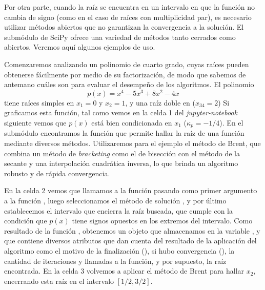 Por otra parte, cuando la raíz se encuentra en un intervalo en que la función no cambia de signo (como en el caso de raíces con multiplicidad par), es necesario utilizar métodos abiertos que no garantizan la convergencia a la solución. El submódulo  de SciPy ofrece una variedad de métodos tanto cerrados como abiertos. Veremos aquí algunos ejemplos de uso.

Comenzaremos analizando un polinomio de cuarto grado, cuyas raíces pueden obtenerse fácilmente por medio de su factorización, de modo que sabemos de antemano cuáles son para evaluar el desempeño de los algoritmos. El polinomio
\[ p(x) = x^4 - 5 x^3 + 8 x^2 - 4 x \]
tiene raíces simples en $x_1 = 0$ y $x_2 = 1$, y una raíz doble en ($x_{34} = 2$) Si graficamos esta función, tal como vemos en la celda 1 del \textit{jupyter-notebook} siguiente
\noindent vemos que $p(x)$ está bien condicionada en $x_1$ ($\kappa_p = -1/4$). En el submódulo encontramos la función  que permite hallar la raíz de una función mediante diversos métodos. Utilizaremos para el ejemplo el método de Brent, que combina un método de \textit{bracketing} como el de bisección con el método de la secante y una interpolación cuadrática inversa, lo que brinda un algoritmo robusto y de rápida convergencia.


En la celda 2 vemos que llamamos a la función  pasando como primer argumento a la función , luego seleccionamos el método de solución , y por último establecemos el intervalo que encierra la raíz buscada, que cumple con la condición que $p(x)$ tiene signos opuestos en los extremos del intervalo. Como resultado de la función , obtenemos un objeto  que almacenamos en la variable , y que contiene diversos atributos que dan cuenta del resultado de la aplicación del algoritmo como el motivo de la finalización (), si hubo convergencia (), la cantidad de iteraciones y llamadas a la función, y por supuesto, la raíz encontrada. En la celda 3 volvemos a aplicar el método de Brent para hallar $x_2$, encerrando esta raíz en el intervalo $[1/2, 3/2]$.

